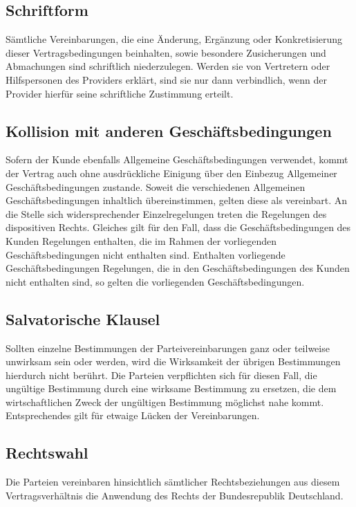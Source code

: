 \documentclass{terms}
\begin{document}
\subsection{Schriftform}
Sämtliche Vereinbarungen, die eine Änderung, Ergänzung oder Konkretisierung dieser Vertragsbedingungen beinhalten, sowie besondere Zusicherungen und Abmachungen sind schriftlich niederzulegen.
Werden sie von Vertretern oder Hilfspersonen des Providers erklärt, sind sie nur dann verbindlich, wenn der Provider hierfür seine schriftliche Zustimmung erteilt.

\subsection{Kollision mit anderen Geschäftsbedingungen}
Sofern der Kunde ebenfalls Allgemeine Geschäftsbedingungen verwendet, kommt der Vertrag auch ohne ausdrückliche Einigung über den Einbezug Allgemeiner Geschäftsbedingungen zustande.
Soweit die verschiedenen Allgemeinen Geschäftsbedingungen inhaltlich übereinstimmen, gelten diese als vereinbart.
An die Stelle sich widersprechender Einzelregelungen treten die Regelungen des dispositiven Rechts.
Gleiches gilt für den Fall, dass die Geschäftsbedingungen des Kunden Regelungen enthalten, die im Rahmen der vorliegenden Geschäftsbedingungen nicht enthalten sind.
Enthalten vorliegende Geschäftsbedingungen Regelungen, die in den Geschäftsbedingungen des Kunden nicht enthalten sind, so gelten die vorliegenden Geschäftsbedingungen.

\subsection{Salvatorische Klausel}
Sollten einzelne Bestimmungen der Parteivereinbarungen ganz oder teilweise unwirksam sein oder werden, wird die Wirksamkeit der übrigen Bestimmungen hierdurch nicht berührt.
Die Parteien verpflichten sich für diesen Fall, die ungültige Bestimmung durch eine wirksame Bestimmung zu ersetzen, die dem wirtschaftlichen Zweck der ungültigen Bestimmung möglichst nahe kommt.
Entsprechendes gilt für etwaige Lücken der Vereinbarungen.

\subsection{Rechtswahl}
Die Parteien vereinbaren hinsichtlich sämtlicher Rechtsbeziehungen aus diesem Vertragsverhältnis die Anwendung des Rechts der Bundesrepublik Deutschland.
\end{document}
